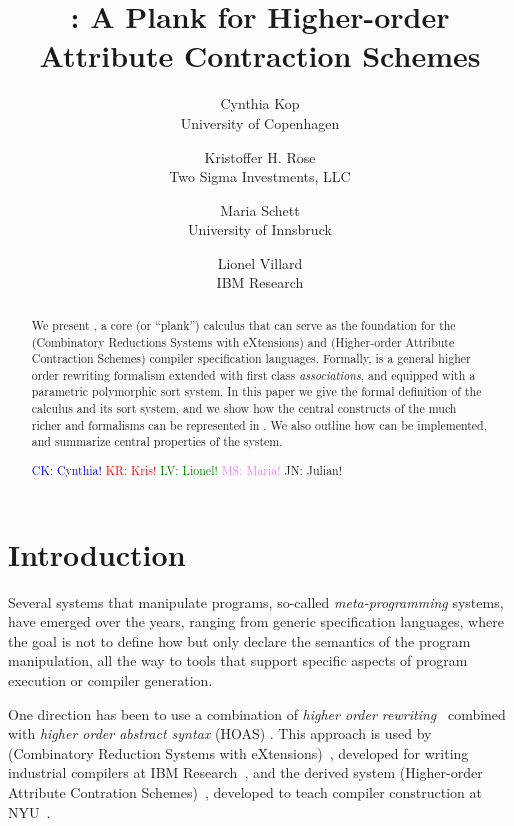\documentclass[letterpaper,11pt]{article}
\title{ \hax: A Plank for Higher-order Attribute Contraction Schemes }
\author{%
  Cynthia Kop \\
  University of Copenhagen
  \and
  Kristoffer H. Rose \\
  Two Sigma Investments, LLC
  \and
  Maria Schett \\
  University of Innsbruck
  \and
  Lionel Villard \\
  IBM Research
}
\newcommand{\CK}[1]{\textcolor{blue}{CK: #1}}
\newcommand{\KR}[1]{\textcolor{red}{KR: #1}}
\newcommand{\LV}[1]{\textcolor{green}{LV: #1}}
\newcommand{\MS}[1]{\textcolor{violet}{MS: #1}}
\newcommand{\JN}[1]{\textcolor{orange!70!black}{JN: #1}}
\begin{document}
\maketitle

\begin{abstract}\noindent
  We present \hax, a core (or ``plank'') calculus that can serve as the foundation for the \CRSX
  (Combinatory Reductions Systems with eXtensions) and \HAX (Higher-order Attribute Contraction
  Schemes) compiler specification languages.
  Formally, \hax is a general higher order rewriting formalism extended with first class
  \emph{associations}, and equipped with a parametric polymorphic sort system.
  In this paper we give the formal definition of the \hax calculus and its sort system, and we show
  how the central constructs of the much richer \HAX and \CRSX formalisms can be represented in
  \hax. We also outline how \hax can be implemented, and summarize central properties of the system.

  \CK{Cynthia!} \KR{Kris!} \LV{Lionel!} \MS{Maria!} \JN{Julian!}
\end{abstract}

\compacttableofcontents


\section{Introduction}\label{sec:intro}

Several systems that manipulate programs, so-called \emph{meta-programming} systems, have emerged
over the years, ranging from generic specification languages, where the goal is not to define how
but only declare the semantics of the program manipulation, all the way to tools that support
specific aspects of program execution or compiler generation.

One direction has been to use a combination of \emph{higher order
  rewriting}~\cite{Jouannaud:klop2005} combined with \emph{higher order abstract syntax} (HOAS)
\cite{PfenningElliot:pldi1988}. This approach is used by \CRSX (Combinatory Reduction Systems with
eXtensions)~\cite{Rose:1996}, developed for writing industrial compilers at IBM
Research~\cite{Rose:hor2010,Rose:rta2011,dp60:ibm2013}, and the derived system \HAX (Higher-order
Attribute Contration Schemes)~\cite{Rose:ts2015}, developed to teach compiler construction at
NYU~\cite{RoseRose:cims2015}.
\end{document}
